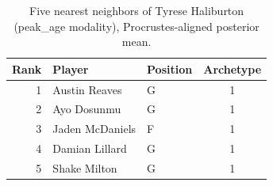 \begin{table}[htbp]
  \centering\small
  \begin{tabular}{rllc}
    \toprule
    Rank & Player & Position & Archetype \\
    \midrule
    1 & Austin Reaves & G & 1 \\
    2 & Ayo Dosunmu & G & 1 \\
    3 & Jaden McDaniels & F & 1 \\
    4 & Damian Lillard & G & 1 \\
    5 & Shake Milton & G & 1 \\
    \bottomrule
  \end{tabular}
  \caption{Five nearest neighbors of Tyrese Haliburton (peak_age modality), Procrustes-aligned posterior mean.}
  \label{tab:Tyrese_Haliburton_neighbors_peak_age}
\end{table}

